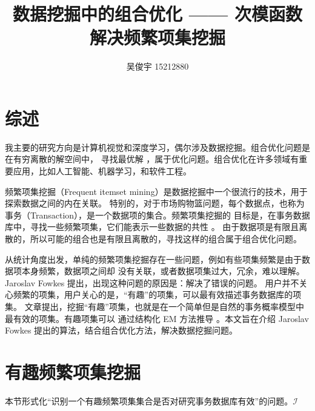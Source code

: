 \documentclass{ctexart}
\title{数据挖掘中的组合优化 —— 次模函数解决频繁项集挖掘}
\author{吴俊宇 15212880}
\begin{document}
\maketitle
\tableofcontents
\pagebreak

\section{综述}

我主要的研究方向是计算机视觉和深度学习，偶尔涉及数据挖掘。组合优化问题是在有穷离散的解空间中，
寻找最优解 \cite{cop-wiki}，属于优化问题。组合优化在许多领域有重要应用，比如人工智能、机器学习，和软件工程。

频繁项集挖掘（Frequent itemset mining）是数据挖掘中一个很流行的技术，用于探索数据之间的内在关联。
特别的，对于市场购物篮问题，每个数据点，也称为事务（Transaction），是一个数据项的集合。频繁项集挖掘的
目标是，在事务数据库中，寻找一些频繁项集，它们能表示一些数据的共性 \cite{hjw-book}。
由于数据项是有限且离散的，所以可能的组合也是有限且离散的，寻找这样的组合属于组合优化问题。

从统计角度出发，单纯的频繁项集挖掘存在一些问题，例如有些项集频繁是由于数据项本身频繁，数据项之间却
没有关联，或者数据项集过大，冗余，难以理解。Jaroslav Fowkes 提出，出现这种问题的原因是：解决了错误的问题。
用户并不关心频繁的项集，用户关心的是，“有趣”的项集，可以最有效描述事务数据库的项集\cite{this-paper}。
文章提出，挖掘“有趣”项集，也就是在一个简单但是自然的事务概率模型中最有效的项集。有趣项集可以
通过结构化 EM 方法推导 \cite{em-book}。本文旨在介绍 Jaroslav Fowkes 提出的算法，结合组合优化方法，解决数据挖掘问题。

\section{有趣频繁项集挖掘}

本节形式化“识别一个有趣频繁项集集合是否对研究事务数据库有效”的问题。$\mathcal{I}$

\pagebreak

\end{document}
